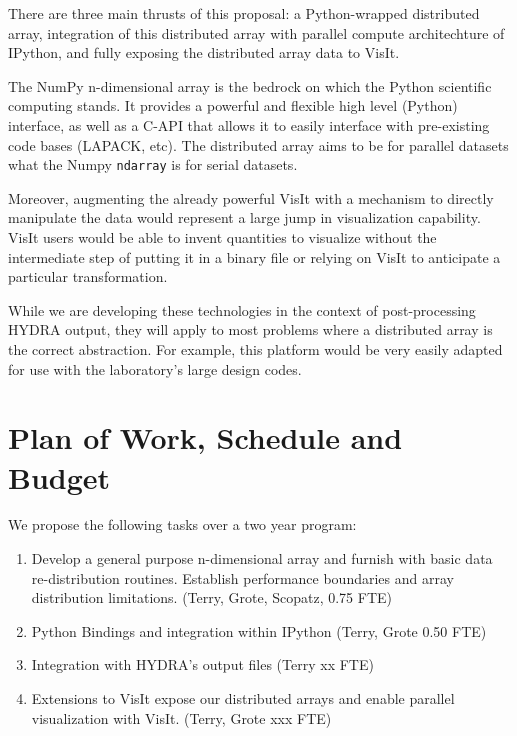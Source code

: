 \documentclass[letterpaper,12pt]{article}
\begin{document}
There are three main thrusts of this proposal: a Python-wrapped distributed array, integration 
of this distributed array with parallel compute architechture of IPython, and fully exposing 
the distributed array data to VisIt.  

The NumPy n-dimensional array is the bedrock on which the Python scientific computing stands.  
It provides a powerful and flexible high level (Python) interface, as well as a C-API that 
allows it to easily interface with pre-existing code bases (LAPACK, etc).  The distributed 
array aims to be for parallel datasets what the Numpy \texttt{ndarray} is for serial datasets.

Moreover, augmenting the already powerful VisIt with a mechanism to directly manipulate the 
data would represent a large jump in visualization capability.  VisIt users would be able 
to invent quantities to visualize without the intermediate step of putting it in a binary 
file or relying on VisIt to anticipate a particular transformation.

While we are developing these technologies in the context of post-processing HYDRA output, 
they will apply to most problems where a distributed array is the correct abstraction.  
For example, this platform would be very easily adapted for use with the laboratory's large 
design codes.



\section*{Plan of Work, Schedule and Budget}

We propose the following tasks over a two year program:

\begin{enumerate}
	\item Develop a general purpose n-dimensional array and furnish with basic data re-distribution routines.  Establish performance boundaries and array distribution limitations. (Terry, Grote, Scopatz, 0.75 FTE) 

	\item Python Bindings and integration within IPython (Terry, Grote 0.50 FTE)

	\item Integration with HYDRA's output files (Terry xx FTE)

	\item Extensions to VisIt expose our distributed arrays and enable parallel visualization with VisIt. (Terry, Grote xxx FTE)

\end{enumerate}
\end{document}
